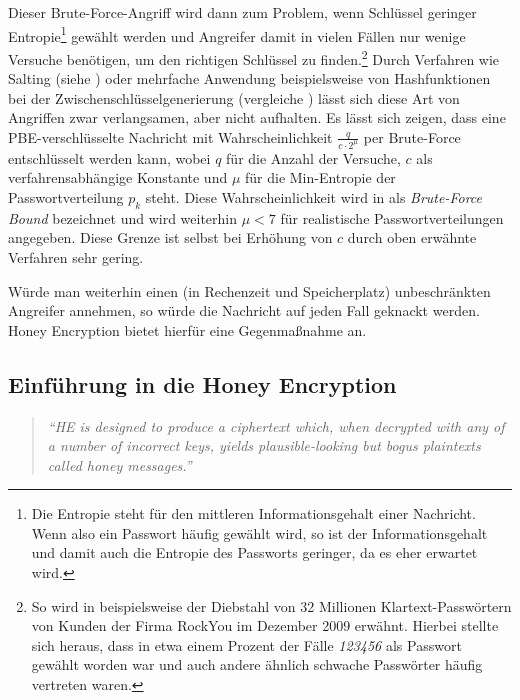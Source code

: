Dieser Brute-Force-Angriff wird dann zum Problem, wenn Schlüssel geringer Entropie\footnote{Die Entropie steht für den mittleren Informationsgehalt einer Nachricht. Wenn also ein Passwort häufig gewählt wird, so ist der Informationsgehalt und damit auch die Entropie des Passworts geringer, da es eher erwartet wird.} gewählt werden und Angreifer damit in vielen Fällen nur wenige Versuche benötigen, um den richtigen Schlüssel zu finden.\footnote{So wird in \cite{IEEE2014} beispielsweise der Diebstahl von 32 Millionen Klartext-Passwörtern von Kunden der Firma RockYou im Dezember 2009 erwähnt. Hierbei stellte sich heraus, dass in etwa einem Prozent der Fälle \emph{123456} als Passwort gewählt worden war und auch andere ähnlich schwache Passwörter häufig vertreten waren.} Durch Verfahren wie Salting (siehe \cite{Schneier2006}) oder mehrfache Anwendung beispielsweise von Hashfunktionen bei der Zwischenschlüsselgenerierung (vergleiche \cite{pbkdf2000}) lässt sich diese Art von Angriffen zwar verlangsamen, aber nicht aufhalten. Es lässt sich zeigen, dass eine PBE-verschlüsselte Nachricht mit Wahrscheinlichkeit \(\frac{q}{c \cdot 2^{\mu}}\) per Brute-Force entschlüsselt werden kann, wobei \(q\) für die Anzahl der Versuche, \(c\) als verfahrensabhängige Konstante und \(\mu\) für die Min-Entropie der Passwortverteilung \(p_k\) steht. Diese Wahrscheinlichkeit wird in \cite{EURO2014} als \textit{Brute-Force Bound} bezeichnet und wird weiterhin \(\mu<7\) für realistische Passwortverteilungen angegeben. Diese Grenze ist selbst bei Erhöhung von \(c\) durch oben erwähnte Verfahren sehr gering.

Würde man weiterhin einen (in Rechenzeit und Speicherplatz) unbeschränkten Angreifer annehmen, so würde die Nachricht auf jeden Fall geknackt werden. Honey Encryption bietet hierfür eine Gegenmaßnahme an.

\subsection{Einführung in die Honey Encryption}
\label{sec:funktionsweise-beispiel}

\begin{quote}
\textit{"`HE is designed to produce a ciphertext which, when decrypted with any of a number of
incorrect keys, yields plausible-looking but bogus plaintexts called honey messages."'} \cite{EURO2014}
\end{quote}

